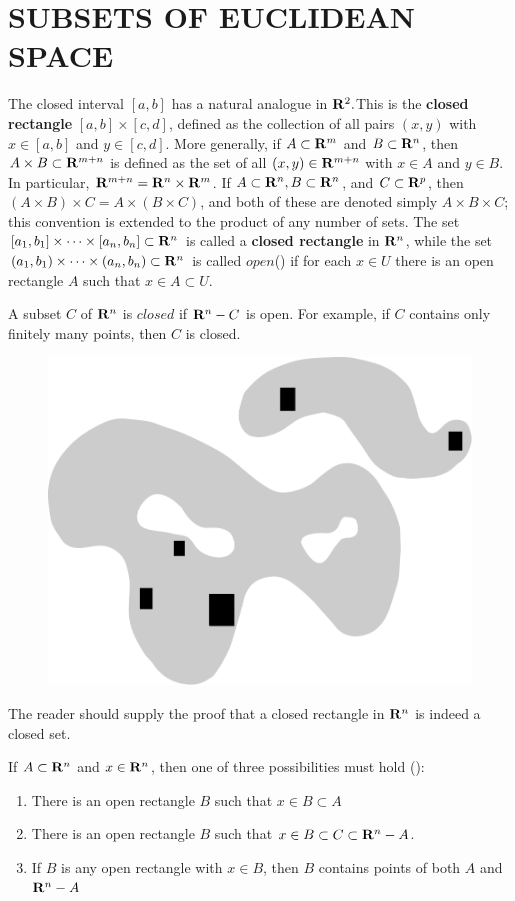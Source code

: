 \clearpage
\section{SUBSETS OF EUCLIDEAN SPACE}
The closed interval $[a,b]$ has a natural analogue in $\mathbf{R}^2. 
$This is the \textbf{closed rectangle} $[a,b]\times [c,d]$, 
defined as the collection of all pairs $(x,y)$ with $x\in [ a, b] $ and $y\in [c, d]$.
More generally, if $A\subset\mathbf{R}^m$ and $B\subset\mathbf{R}^n$, 
then $A\times B\subset\mathbf{R}^{m+n}$ is defined as the set of all  
$(x, y) \in \mathbf{R}^{m+n}$ with $x\in A$ and $y\in B$.
In particular, $\mathbf{R}^{m+n} = \mathbf{R}^n\times \mathbf{R}^m$.
If $A\subset \mathbf{R}^n, B\subset \mathbf{R}^n$, and $C\subset \mathbf{R}^p$,
then $(A\times B)\times C = A\times(B\times C)$, and 
both of these are denoted simply $A\times B\times C$; this 
convention is extended to the product of any number of sets.
The set $[a_1, b_1]\times \cdots \times [a_n,b_n]\subset \mathbf{R}^n$ 
is called a \textbf{closed rectangle} in $\mathbf{R}^n$, while the set 
$(a_1, b_1)\times \cdots \times (a_n,b_n)\subset \mathbf{R}^n$
is called $open$() if for each $x\in U$ there is an open 
rectangle $A$ such that $x\in A\subset U$.

A subset $C$ of $\mathbf{R}^n$ is $closed$ if $\mathbf{R}^n - C$ is open.
For example, if $C$ contains only finitely many points, then $C$ is 
closed.

\begin{figure}[!htb]
    \centering
    \includegraphics[width=.75\linewidth]{./pics/Fig1-1.pdf}
    \caption{}
    \label{Fig 1-1}
\end{figure}

The reader should supply the proof that a closed rectangle in
$\mathbf{R}^n$ is indeed a closed set.

If $A\subset \mathbf{R}^n$ and $x\in \mathbf{R}^n$, then one of three possibilities must
hold ():
\begin{enumerate}[label={\upshape(\arabic*)}]
    \item There is an open rectangle $B$ such that $x\in B\subset A$
    \item There is an open rectangle $B$ such that $x \in B \subset C \subset \mathbf{R}^n-A$.
    \item If $B$ is any open rectangle with $x\in B$, then $B$ contains points of both $A$ and $\mathbf{R}^n-A$
\end{enumerate}

